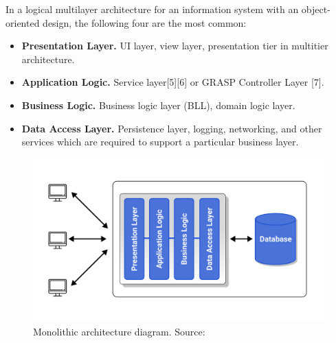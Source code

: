 In a logical multilayer architecture for an information system with an object-oriented design, the following four are the most common:

\begin{itemize} %
    \item \textbf{Presentation Layer.} UI layer, view layer, presentation tier in multitier architecture.
    \item \textbf{Application Logic.} Service layer[5][6] or GRASP Controller Layer [7].
    \item \textbf{Business Logic.} Business logic layer (BLL), domain logic layer.
    \item \textbf{Data Access Layer.} Persistence layer, logging, networking, and other services which are required to support a particular business layer.
\end{itemize}

\begin{figure}[H]
    \centering
    \includegraphics[width=1\textwidth]{Pictures/Monolith_architecture.pdf}
    \caption{Monolithic architecture diagram. Source: }\label{fig:figure2}
\end{figure}

